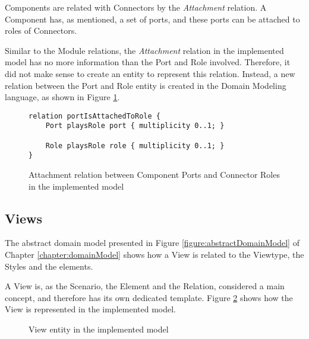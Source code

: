 Components are related with Connectors by the \textit{Attachment} relation. A Component has, as mentioned, a set of ports, and these ports can be attached to roles of Connectors.

Similar to the Module relations, the \textit{Attachment} relation in the implemented model has no more information than the Port and Role involved. Therefore, it did not make sense to create an entity to represent this relation. Instead, a new relation between the Port and Role entity is created in the Domain Modeling language, as shown in Figure \ref{figure:modelAttachmentRelation}.

\begin{figure}[h]
\lstset{style=customjava}
\begin{lstlisting}
relation portIsAttachedToRole {
	Port playsRole port { multiplicity 0..1; }
	
	Role playsRole role { multiplicity 0..1; }
}
\end{lstlisting}
\caption{Attachment relation between Component Ports and Connector Roles in the implemented model}
\label{figure:modelAttachmentRelation}
\end{figure}


\subsection{Views}
\label{subsection:modelViews}

The abstract domain model presented in Figure \ref{figure:abstractDomainModel} of Chapter \ref{chapter:domainModel} shows how a View is related to the Viewtype, the Styles and the elements. 

A View is, as the Scenario, the Element and the Relation, considered a main concept, and therefore has its own dedicated template. Figure \ref{figure:modelView} shows how the View is represented in the implemented model.

\begin{figure}[h]
\centering
\renewcommand {\umltextcolor}{black}
\renewcommand {\umlfillcolor}{none}
\renewcommand {\umldrawcolor}{black}
\caption{View entity in the implemented model}
\label{figure:modelView}
\end{figure}

